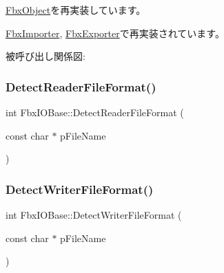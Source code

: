 \hyperlink{class_fbx_object_a313503bc645af3fdceb4a99ef5cea7eb}{Fbx\+Object}を再実装しています。



\hyperlink{class_fbx_importer_ada4dcdb8770ebe90bacd9adcb3f562c0}{Fbx\+Importer}, \hyperlink{class_fbx_exporter_aa308b9a9901e8c98d0b54f0bd20daad2}{Fbx\+Exporter}で再実装されています。

被呼び出し関係図\+:
\mbox{\label{class_fbx_i_o_base_aeeed7fece0297ede49ba8ceda58b2743}} 
\subsubsection{\texorpdfstring{Detect\+Reader\+File\+Format()}{DetectReaderFileFormat()}}
{\footnotesize\ttfamily int Fbx\+I\+O\+Base\+::\+Detect\+Reader\+File\+Format (\begin{DoxyParamCaption}\item[{const char $\ast$}]{p\+File\+Name }\end{DoxyParamCaption})\hspace{0.3cm}{\ttfamily [protected]}}

\mbox{\label{class_fbx_i_o_base_ab33025566a08451ec2cffedfc1130ad4}} 
\subsubsection{\texorpdfstring{Detect\+Writer\+File\+Format()}{DetectWriterFileFormat()}}
{\footnotesize\ttfamily int Fbx\+I\+O\+Base\+::\+Detect\+Writer\+File\+Format (\begin{DoxyParamCaption}\item[{const char $\ast$}]{p\+File\+Name }\end{DoxyParamCaption})\hspace{0.3cm}{\ttfamily [protected]}}

\mbox{\label{class_fbx_i_o_base_ace2742dc782d87dc5bb08bceacb451b7}} 
